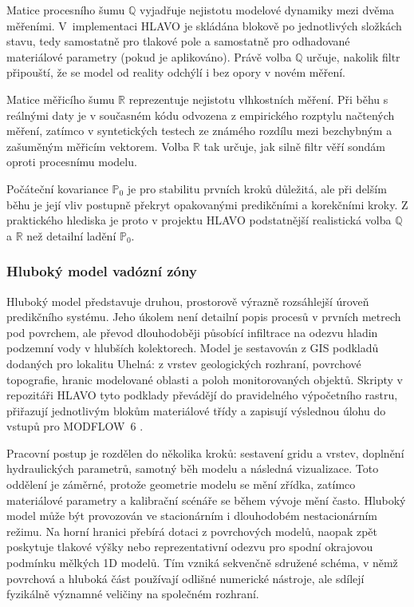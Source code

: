 \documentclass[11pt,a4paper]{article}
\def\tn#1{{\mathbb{#1}}}
\begin{document}
\begin{onehalfspacing}
Matice procesního šumu $\tn Q$ vyjadřuje nejistotu modelové dynamiky mezi dvěma
měřeními. V~implementaci HLAVO je skládána blokově po jednotlivých složkách
stavu, tedy samostatně pro tlakové pole a samostatně pro odhadované materiálové
parametry (pokud je aplikováno). Právě volba $\tn Q$ určuje, nakolik filtr připouští, že se model od reality odchýlí i bez opory v novém měření.

Matice měřicího šumu $\tn R$ reprezentuje nejistotu vlhkostních měření. Při
běhu s reálnými daty je v současném kódu odvozena z empirického rozptylu
načtených měření, zatímco v syntetických testech ze známého rozdílu mezi
bezchybným a zašuměným měřicím vektorem. Volba $\tn R$ tak určuje, jak silně
filtr věří sondám oproti procesnímu modelu.

Počáteční kovariance $\tn P_0$ je pro stabilitu prvních kroků důležitá, ale při
delším běhu je její vliv postupně překryt opakovanými predikčními a korekčními
kroky. Z praktického hlediska je proto v projektu HLAVO podstatnější realistická
volba $\tn Q$ a $\tn R$ než detailní ladění $\tn P_0$.


\subsubsection{Hluboký model vadózní zóny}

Hluboký model představuje druhou, prostorově výrazně rozsáhlejší úroveň
predikčního systému. Jeho úkolem není detailní popis procesů v prvních metrech
pod povrchem, ale převod dlouhodoběji působící infiltrace na odezvu hladin
podzemní vody v hlubších kolektorech. Model je sestavován z GIS podkladů
dodaných pro lokalitu Uhelná: z vrstev geologických rozhraní, povrchové
topografie, hranic modelované oblasti a poloh monitorovaných objektů. Skripty
v repozitáři HLAVO tyto podklady převádějí do pravidelného výpočetního rastru,
přiřazují jednotlivým blokům materiálové třídy a zapisují výslednou úlohu do
vstupů pro MODFLOW~6 \parencite{MODFLOW6_Framework_Hughes2017,HLAVO_GitHub}.

Pracovní postup je rozdělen do několika kroků: sestavení gridu a vrstev,
doplnění hydraulických parametrů, samotný běh modelu a následná vizualizace.
Toto oddělení je záměrné, protože geometrie modelu se mění zřídka, zatímco
materiálové parametry a kalibrační scénáře se během vývoje mění často.
Hluboký model může být provozován ve stacionárním i dlouhodobém nestacionárním
režimu. Na horní hranici přebírá dotaci z povrchových modelů, naopak zpět
poskytuje tlakové výšky nebo reprezentativní odezvu pro spodní okrajovou
podmínku mělkých 1D modelů. Tím vzniká sekvenčně sdružené schéma, v němž
povrchová a hluboká část používají odlišné numerické nástroje, ale sdílejí
fyzikálně významné veličiny na společném rozhraní.


\end{onehalfspacing}
\end{document}
